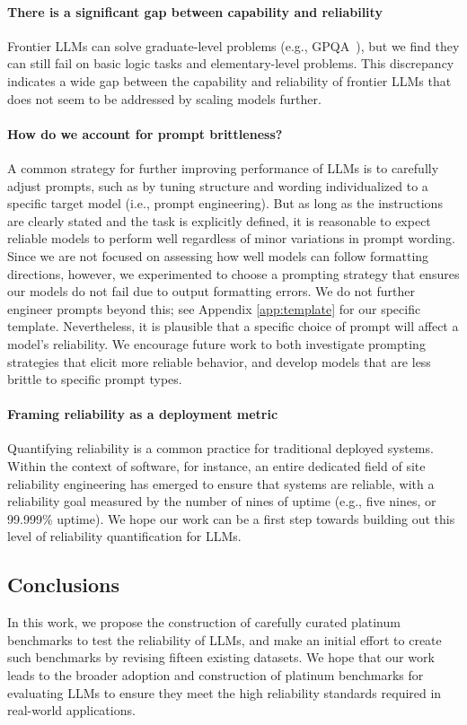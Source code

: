 \paragraph{There is a significant gap between capability and reliability} Frontier LLMs can solve graduate-level problems (e.g., GPQA~\cite{rein2023gpqa}), but we find they can still fail on basic logic tasks and elementary-level problems. This discrepancy indicates a wide gap between the capability and reliability of frontier LLMs that does not seem to be addressed by scaling models further. 


\paragraph{How do we account for prompt brittleness?}
A common strategy for further improving performance of LLMs is to carefully adjust prompts, such as by tuning structure and wording individualized to a specific target model (i.e., prompt engineering).
But as long as the instructions are clearly stated and the task is explicitly defined, it is reasonable to expect reliable models to perform well regardless of minor variations in prompt wording. Since we are not focused on assessing how well models can follow formatting directions, however, we experimented to choose a prompting strategy that ensures our models do not fail due to output formatting errors. We do not further engineer prompts beyond this; see Appendix \ref{app:template} for our specific template. Nevertheless, it is plausible that a specific choice of prompt will affect a model's reliability. We encourage future work to both investigate prompting strategies that elicit more reliable behavior, and develop models that are less brittle to specific prompt types.

\paragraph{Framing reliability as a deployment metric}%
Quantifying reliability is a common practice for traditional deployed systems. Within the context of software, for instance, an entire dedicated field of site reliability engineering has emerged to ensure that systems are reliable, with a reliability goal measured by the number of nines of uptime (e.g., five nines, or 99.999\% uptime). We hope our work can be a first step towards building out this level of reliability quantification for LLMs.

\subsection{Conclusions } In this work, we propose the construction of carefully curated platinum benchmarks to test the reliability of LLMs, and make an initial effort to create such benchmarks by revising fifteen existing datasets. We hope that our work leads to the broader adoption and construction of platinum benchmarks for evaluating LLMs to ensure they meet the high reliability standards required in real-world applications.
